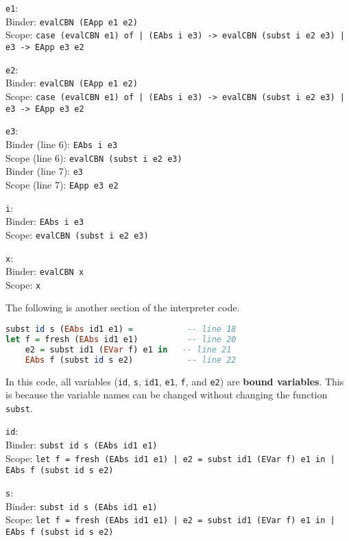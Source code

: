 \documentclass{article}
\theoremstyle{theorem}
\theoremstyle{definition}
\theoremstyle{remark}
\begin{document}
\noindent \texttt{e1}:\\
Binder: \texttt{evalCBN (EApp e1 e2)}\\
Scope: \texttt{case (evalCBN e1) of
| (EAbs i e3) -> evalCBN (subst i e2 e3)
| e3 -> EApp e3 e2}

\noindent \texttt{e2}:\\
Binder: \texttt{evalCBN (EApp e1 e2)}\\
Scope: \texttt{case (evalCBN e1) of
| (EAbs i e3) -> evalCBN (subst i e2 e3)
| e3 -> EApp e3 e2}

\noindent \texttt{e3}:\\
Binder (line 6): \texttt{EAbs i e3}\\
Scope (line 6): \texttt{evalCBN (subst i e2 e3)}\\
Binder (line 7): \texttt{e3}\\
Scope (line 7): \texttt{EApp e3 e2}

\noindent \texttt{i}:\\
Binder: \texttt{EAbs i e3}\\
Scope: \texttt{evalCBN (subst i e2 e3)}

\noindent \texttt{x}:\\
Binder: \texttt{evalCBN x}\\
Scope: \texttt{x}

\newpage

The following is another section of the interpreter code.
\begin{lstlisting}[language=Haskell]
subst id s (EAbs id1 e1) =           -- line 18
let f = fresh (EAbs id1 e1)          -- line 20
    e2 = subst id1 (EVar f) e1 in   -- line 21
    EAbs f (subst id s e2)           -- line 22
\end{lstlisting}

\noindent In this code, all variables (\texttt{id}, \texttt{s}, \texttt{id1}, \texttt{e1}, \texttt{f}, and \texttt{e2}) are \textbf{bound variables}. This is because the variable names can be changed without changing the function \texttt{subst}.

\noindent \texttt{id}:\\
Binder: \texttt{subst id s (EAbs id1 e1)}\\
Scope: \texttt{let f = fresh (EAbs id1 e1) | e2 = subst id1 (EVar f) e1 in | EAbs f (subst id s e2)}

\noindent \texttt{s}:\\
Binder: \texttt{subst id s (EAbs id1 e1)}\\
Scope: \texttt{let f = fresh (EAbs id1 e1) | e2 = subst id1 (EVar f) e1 in | EAbs f (subst id s e2)}
\end{document}
